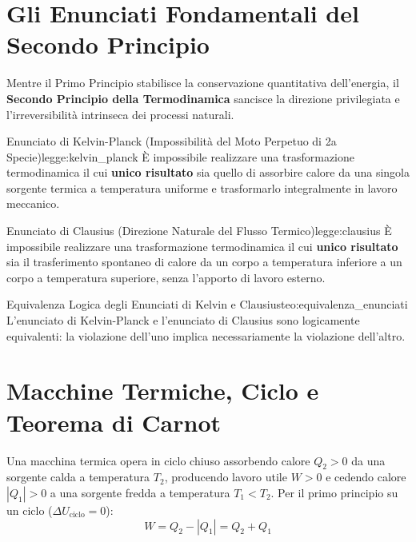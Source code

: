 \section{Gli Enunciati Fondamentali del Secondo Principio}
\label{sec:enunciati_secondo_principio}

Mentre il Primo Principio stabilisce la conservazione quantitativa dell'energia, il \textbf{Secondo Principio della Termodinamica} sancisce la direzione privilegiata e l'irreversibilità intrinseca dei processi naturali.

\begin{legge}{Enunciato di Kelvin-Planck (Impossibilità del Moto Perpetuo di 2a Specie)}{legge:kelvin_planck}
È impossibile realizzare una trasformazione termodinamica il cui \textbf{unico risultato} sia quello di assorbire calore da una singola sorgente termica a temperatura uniforme e trasformarlo integralmente in lavoro meccanico.
\end{legge}

\begin{legge}{Enunciato di Clausius (Direzione Naturale del Flusso Termico)}{legge:clausius}
È impossibile realizzare una trasformazione termodinamica il cui \textbf{unico risultato} sia il trasferimento spontaneo di calore da un corpo a temperatura inferiore a un corpo a temperatura superiore, senza l'apporto di lavoro esterno.
\end{legge}

\begin{teorema}{Equivalenza Logica degli Enunciati di Kelvin e Clausius}{teo:equivalenza_enunciati}
L'enunciato di Kelvin-Planck e l'enunciato di Clausius sono logicamente equivalenti: la violazione dell'uno implica necessariamente la violazione dell'altro.
\end{teorema}

\section{Macchine Termiche, Ciclo e Teorema di Carnot}
\label{sec:carnot}

Una macchina termica opera in ciclo chiuso assorbendo calore $Q_2 > 0$ da una sorgente calda a temperatura $T_2$, producendo lavoro utile $W > 0$ e cedendo calore $|Q_1| > 0$ a una sorgente fredda a temperatura $T_1 < T_2$.
Per il primo principio su un ciclo ($\Delta U_{\text{ciclo}} = 0$):
\begin{equation}
    W = Q_2 - |Q_1| = Q_2 + Q_1
\end{equation}

